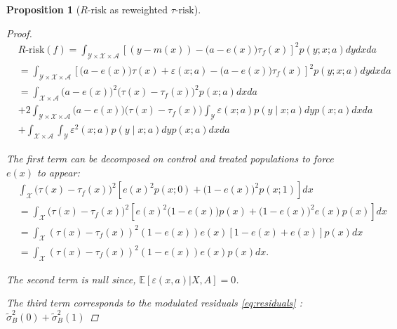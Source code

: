 \documentclass[11pt]{article}
\newtheorem{proposition*}{Proposition}
\newtheorem{proof}{Proof}
\begin{document}
\begin{appendices}
\begin{proposition*}[$R\text{-risk}$ as reweighted $\tau
                \text{-risk}$]
\begin{proof}
            \begin{align*}
                 & R\text {-risk}(f) =\int_{\mathcal{Y} \times \mathcal{X} \times \mathcal{A}}[(y-m(x))-\big(a-e(x)\big) \tau_f(x)]^{2} p(y ; x ; a) d y d x d a                                     \\
                 & =\int_{\mathcal{Y} \times \mathcal{X} \times \mathcal{A}} \left[\big(a-e(x)\big)\tau(x)+\varepsilon(x ; a)-\big(a-e(x)\big) \tau_f(x)\right]^{2} p(y ; x ; a) d y d x da          \\
                 & =\int_{\mathcal{X} \times \mathcal{A}}\big(a-e(x)\big)^{2}\big(\tau(x)- \tau_f(x)\big)^{2} p(x ; a) d x d a                                                                       \\
                 & + 2  \int_{\mathcal{Y} \times \mathcal{X} \times \mathcal{A}}\big(a-e(x)\big)\big(\tau(x)-\tau_f(x)\big)  \int_{\mathcal{Y}} \varepsilon(x ; a) p(y \mid x ; a) d y p(x ; a)dx da \\
                 & +\int_{\mathcal{X} \times \mathcal{A}} \int_{\mathcal{Y}} \varepsilon^{2}(x ; a) p(y \mid x ; a) d y p(x ; a) d x d a
            \end{align*}

            The first term can be decomposed on control and treated populations to force
            $e(x)$ to appear:
            \begin{align*}
                 & \int_{\mathcal{X}}\big(\tau(x)-\tau_f(x)\big)^{2}\left[e(x)^{2}p(x;0) + \big(1-e(x)\big)^{2} p(x;1)\right] d x                    \\
                 & =\int_{\mathcal{X}}\big(\tau(x)-\tau_f(x)\big)^{2}  \left[e(x)^{2}\big(1-e(x)\big)p(x) + \big(1-e(x)\big)^{2}e(x) p(x)\right] d x \\
                 & =\int_{\mathcal{X}}(\tau(x)-\tau_f(x))^{2}(1-e(x)) e(x)[1-e(x)+e(x)] p(x) d x                                                     \\ &=\int_{\mathcal{X}}(\tau(x)-\tau_f(x))^{2}(1-e(x)) e(x) p(x) d x.
            \end{align*}

            The second term is null since, $\mathbb E[\varepsilon(x, a) |X, A]=0$.

            The third term corresponds to the modulated residuals \ref{eq:residuals} :
            $\tilde{\sigma}_B^2(0) + \tilde{\sigma}_B^2(1)$

        \end{proof}
    \end{proposition*}


\end{appendices}
\end{document}
